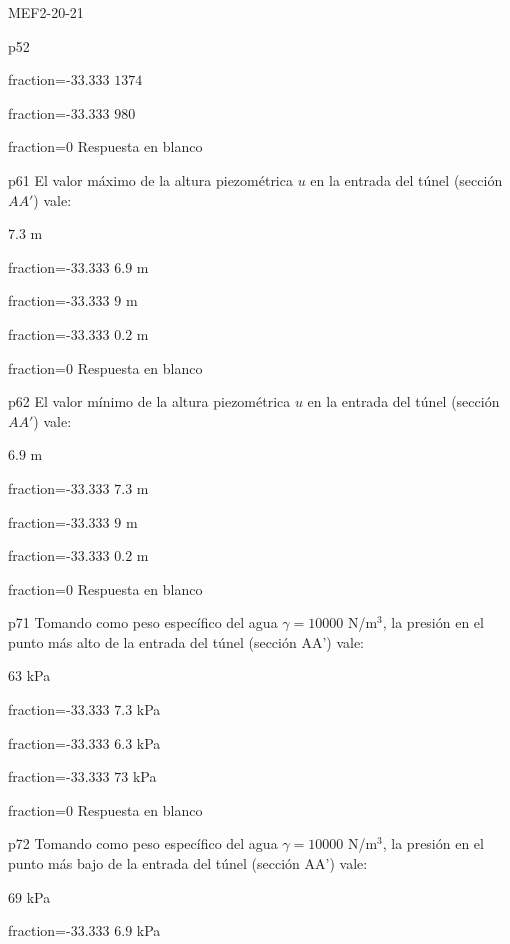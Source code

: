 \documentclass[a4paper]{article}
\begin{document}
\begin{quiz}{MEF2-20-21}
\begin{multi}{p52}
\item[fraction=-33.333] $1374$
\item[fraction=-33.333] $980$
\item[fraction=0] Respuesta en blanco
\end{multi}
\begin{multi}{p61}
	El valor m\'aximo de la altura piezom\'etrica $u$ en la entrada del t\'unel (secci\'on $AA'$) vale:
	\item* $7.3$ m
	\item[fraction=-33.333] $6.9$ m
	\item[fraction=-33.333] $9$ m
	\item[fraction=-33.333] $0.2$ m
	\item[fraction=0] Respuesta en blanco
\end{multi}
\begin{multi}{p62}
	El valor m\'inimo de la altura piezom\'etrica $u$ en la entrada del t\'unel (secci\'on $AA'$) vale:
	\item* $6.9$ m
	\item[fraction=-33.333] $7.3$ m
	\item[fraction=-33.333] $9$ m
	\item[fraction=-33.333] $0.2$ m
	\item[fraction=0] Respuesta en blanco
\end{multi}
\begin{multi}{p71}
	Tomando como peso espec\'ifico del agua $\gamma=10000$ N/m$^3$, la presi\'on en el punto
	m\'as alto de la entrada del t\'unel (secci\'on AA') vale:
	\item* $63$ kPa
	\item[fraction=-33.333] $7.3$ kPa
	\item[fraction=-33.333] $6.3$ kPa
	\item[fraction=-33.333] $73$ kPa
	\item[fraction=0] Respuesta en blanco
\end{multi}
\begin{multi}{p72}
	Tomando como peso espec\'ifico del agua $\gamma=10000$ N/m$^3$, la presi\'on en el punto
	m\'as bajo de la entrada del t\'unel (secci\'on AA') vale:
	\item* $69$ kPa
	\item[fraction=-33.333] $6.9$ kPa

\end{multi}
\end{quiz}
\end{document}
